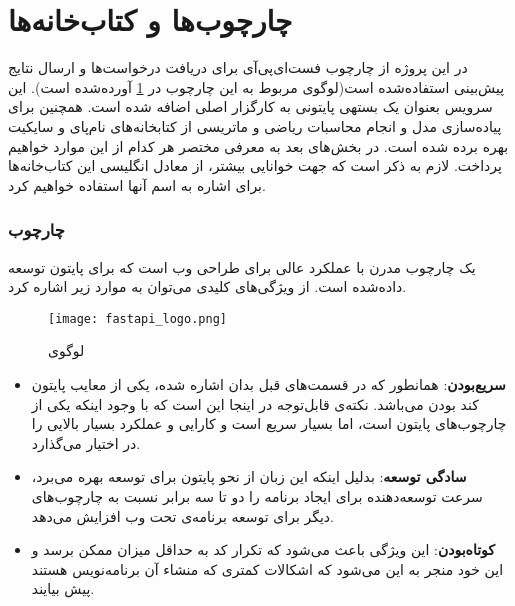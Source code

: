 \section{چارچوب‌ها و کتاب‌خانه‌ها}
در این پروژه از چارچوب فست‌ای‌پی‌آی برای دریافت درخواست‌ها و ارسال نتایج پیش‌بینی استفاده‌شده است(لوگوی مربوط به این چارچوب در \cref{fig:fastapi_logo}\cite{tiangoloFastAPI} آورده‌شده است). این سرویس بعنوان یک بستهی پایتونی به کارگزار اصلی اضافه شده است. همچنین برای پیاده‌سازی مدل و انجام محاسبات ریاضی و ماتریسی از کتابخانه‌های نام‌پای و سایکیت بهره برده شده است. در بخش‌های بعد به معرفی مختصر هر کدام از این موارد خواهیم پرداخت. لازم به ذکر است که جهت خوانایی بیشتر، از معادل انگلیسی این کتاب‌خانه‌ها برای اشاره به اسم آنها استفاده خواهیم کرد.

\subsubsection{چارچوب }
یک چارچوب مدرن با عملکرد عالی برای طراحی وب است که برای پایتون توسعه داده‌شده است. از ویژگی‌های کلیدی  می‌توان به موارد زیر اشاره کرد\cite{tiangoloFastAPI}.

\begin{figure}[!h]
\centerline{\texttt{[image: fastapi\_logo.png]}}
\caption{لوگوی \cite{tiangoloFastAPI}}
\label{fig:fastapi_logo}
\end{figure}
\begin{itemize}

\item \textbf{سریع‌بودن}: همانطور که در قسمت‌های قبل بدان اشاره شده، یکی از معایب پایتون کند بودن می‌باشد. نکته‌ی قابل‌توجه در اینجا این است که با وجود اینکه یکی از چارچوب‌های پایتون است، اما  بسیار سریع است و کارایی و عملکرد بسیار بالایی را در اختیار می‌گذارد.

\item \textbf{سادگی توسعه}: بدلیل اینکه این زبان از نحو پایتون برای توسعه بهره می‌برد، سرعت توسعه‌دهنده برای ایجاد برنامه را دو تا سه برابر نسبت به چارچوب‌های دیگر برای توسعه برنامه‌ی تحت وب افزایش می‌دهد.

\item \textbf{کوتاه‌بودن}: این ویژگی باعث می‌شود که تکرار کد به حداقل میزان ممکن برسد و این خود منجر به این می‌شود که اشکالات کمتری که منشاء آن برنامه‌نویس هستند پیش بیایند.

\end{itemize}

